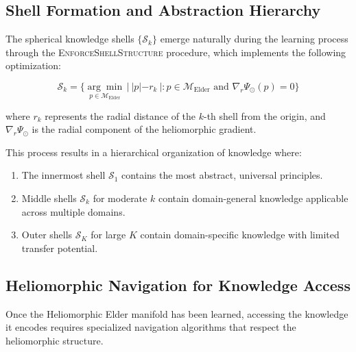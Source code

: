\subsection{Shell Formation and Abstraction Hierarchy}

The spherical knowledge shells $\{\mathcal{S}_k\}$ emerge naturally during the learning process through the \textsc{EnforceShellStructure} procedure, which implements the following optimization:

\begin{equation}
\mathcal{S}_k = \{\underset{p \in \mathcal{M}_{\text{Elder}}}{\arg\min} \, |~|p| - r_k~| : p \in \mathcal{M}_{\text{Elder}} \text{ and } \nabla_r \Psi_{\odot}(p) = 0\}
\end{equation}

where $r_k$ represents the radial distance of the $k$-th shell from the origin, and $\nabla_r \Psi_{\odot}$ is the radial component of the heliomorphic gradient.

This process results in a hierarchical organization of knowledge where:

\begin{enumerate}
    \item The innermost shell $\mathcal{S}_1$ contains the most abstract, universal principles.
    \item Middle shells $\mathcal{S}_k$ for moderate $k$ contain domain-general knowledge applicable across multiple domains.
    \item Outer shells $\mathcal{S}_K$ for large $K$ contain domain-specific knowledge with limited transfer potential.
\end{enumerate}

\subsection{Heliomorphic Navigation for Knowledge Access}

Once the Heliomorphic Elder manifold has been learned, accessing the knowledge it encodes requires specialized navigation algorithms that respect the heliomorphic structure.

